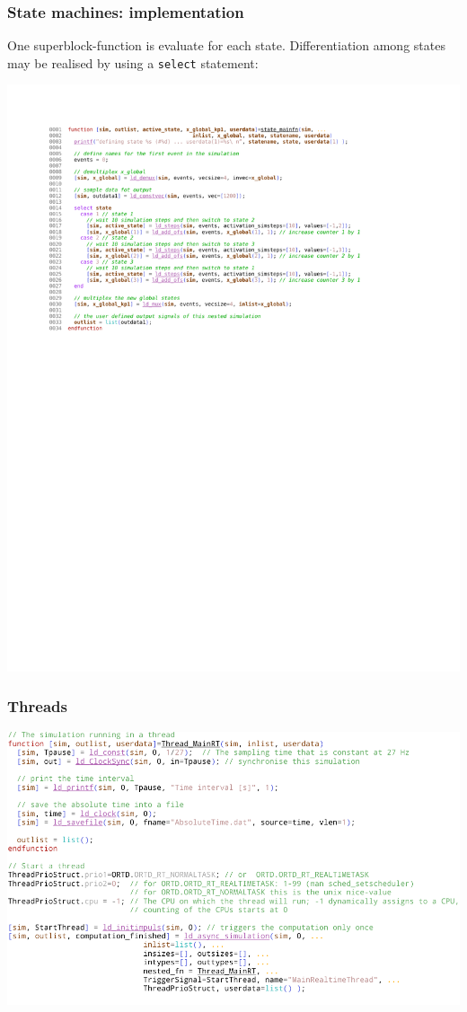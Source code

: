 \documentclass[serif,9pt,xcolor=dvipsnames]{beamer}
\begin{document}
\begin{frame}
  \frametitle{State machines: implementation}

One superblock-function is evaluate for each state. Differentiation among states may be realised by using a \texttt{select} statement:
  

\centering \includegraphics[trim=2.7cm 9.5cm 4cm 1.4cm, clip, width=1.0\linewidth]{figures/state_mainfn.pdf} 

\end{frame}


\begin{frame}
  \frametitle{Threads}

  \centering \includegraphics[width=1\linewidth]{figures/Threads_crop.pdf} 
\end{frame}
\end{document}
